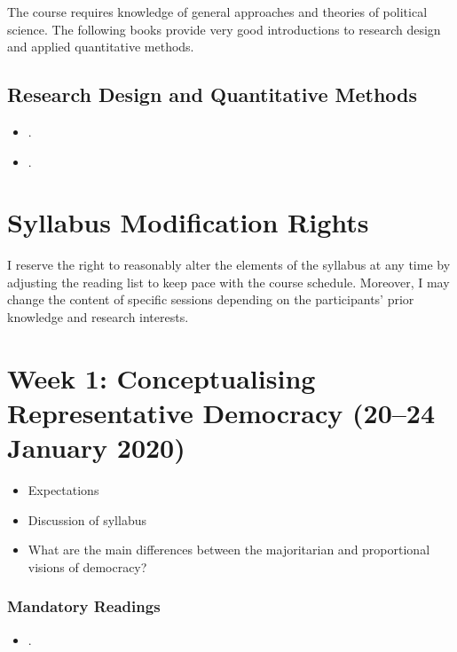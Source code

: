 \documentclass[abstract=on,parskip=full,headings=standardclasses,fontsize=11pt,paper=a4]{scrartcl}
\begin{document}
The course requires knowledge of general approaches and theories of political science. The following books provide very good introductions to research design and applied quantitative methods.

\subsection*{Research Design and Quantitative Methods}
\begin{itemize}
\item {}.
\item {}.
\end{itemize}


\section*{Syllabus Modification Rights}

I reserve the right to reasonably alter the elements of the syllabus at any time by adjusting the reading list to keep pace with the course schedule. Moreover, I may change the content of specific sessions depending on the participants' prior knowledge and research interests.




\tableofcontents

\section{Week 1: Conceptualising Representative Democracy (20--24 January 2020)}

\begin{itemize}
\renewcommand\labelitemi{--}
\item Expectations
\item Discussion of syllabus
\item What are the main differences between the majoritarian and proportional visions of democracy?
\end{itemize}


\subsubsection*{Mandatory Readings}
\begin{itemize}
\item {}.
\end{itemize}
\end{document}

